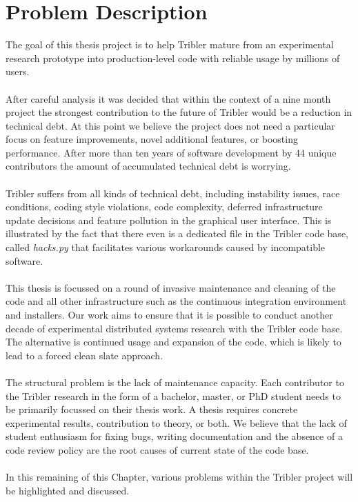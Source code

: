 \chapter{Problem Description}
\label{chapter:problem-description}
The goal of this thesis project is to help Tribler mature from an experimental research prototype into production-level code with reliable usage by millions of users.\\\\
After careful analysis it was decided that within the context of a nine month project the strongest contribution to the future of Tribler would be a reduction in technical debt. At this point we believe the project does not need a particular focus on feature improvements, novel additional features, or boosting performance. After more than ten years of software development by 44 unique contributors the amount of accumulated technical debt is worrying.\\\\
Tribler suffers from all kinds of technical debt, including instability issues, race conditions, coding style violations, code complexity, deferred infrastructure update decisions and feature pollution in the graphical user interface. This is illustrated by the fact that there even is a dedicated file in the Tribler code base, called \emph{hacks.py} that facilitates various workarounds caused by incompatible software.\\\\
This thesis is focussed on a round of invasive maintenance and cleaning of the code and all other infrastructure such as the continuous integration environment and installers. Our work aims to ensure that it is possible to conduct another decade of experimental distributed systems research with the Tribler code base. The alternative is continued usage and expansion of the code, which is likely to lead to a forced clean slate approach.\\\\
The structural problem is the lack of maintenance capacity. Each contributor to the Tribler research in the form of a bachelor, master, or PhD student needs to be primarily focussed on their thesis work. A thesis requires concrete experimental results, contribution to theory, or both. We believe that the lack of student enthusiasm for fixing bugs, writing documentation and the absence of a code review policy are the root causes of current state of the code base.\\\\
In this remaining of this Chapter, various problems within the Tribler project will be highlighted and discussed.

